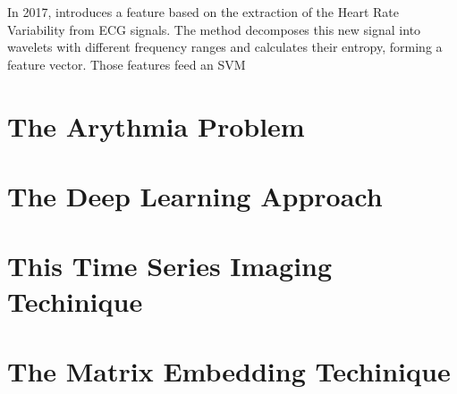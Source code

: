 In 2017, \citeauthor{review-3} introduces a feature based on the extraction of the Heart Rate Variability from \acrshort{ECG} signals. The method decomposes this new signal into wavelets with different frequency ranges and calculates their entropy, forming a feature vector. Those features feed an \acrshort{SVM} 	 

\section{The Arythmia Problem}
\label{sec:arythmia}

\section{The Deep Learning Approach}
\label{sec:deep_learning}

\section{This Time Series Imaging Techinique}
\label{sec:imaging}

\section{The Matrix Embedding Techinique}
\label{sec:matrix}

